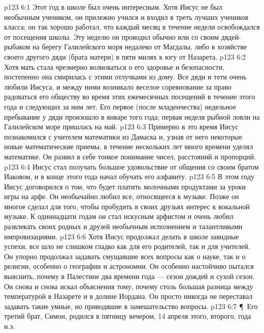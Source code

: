 \vs p123 6:1 Этот год в школе был очень интересным. Хотя Иисус не был необычным учеником, он прилежно учился и входил в треть лучших учеников класса; он так хорошо работал, что каждый месяц в течение недели освобождался от посещения школы. Эту неделю он проводил обычно или со своим дядей\hyp{}рыбаком на берегу Галилейского моря недалеко от Магдалы, либо в хозяйстве своего другого дяди (брата матери) в пяти милях к югу от Назарета.
\vs p123 6:2 Хотя мать стала чрезмерно волноваться о его здоровье и безопасности, постепенно она смирилась с этими отлучками из дому. Все дяди и тети очень любили Иисуса, и между ними возникало веселое соревнование за право радоваться его обществу во время этих ежемесячных посещений в течение этого года и следующих за ним лет. Его первое (после младенчества) недельное пребывание у дяди произошло в январе того года; первая неделя рыбной ловли на Галилейском море пришлась на май.
\vs p123 6:3 Примерно в это время Иисус познакомился с учителем математики из Дамаска и, узнав от него некоторые новые математические приемы, в течение нескольких лет много времени уделял математике. Он развил в себе тонкое понимание чисел, расстояний и пропорций.
\vs p123 6:4 Иисус стал получать большое удовольствие от общения со своим братом Иаковом, и в конце этого года начал обучать его алфавиту.
\vs p123 6:5 В этом году Иисус договорился о том, что будет платить молочными продуктами за уроки игры на арфе. Он необычайно любил все, относящееся к музыке. Позже он многое сделал для того, чтобы пробудить в своих друзьях интерес к вокальной музыке. К одиннадцати годам он стал искусным арфистом и очень любил развлекать своих родных и друзей необычным исполнением и талантливыми импровизациями.
\vs p123 6:6 Хотя Иисус продолжал делать в школе завидные успехи, все шло не слишком гладко как для его родителей, так и для учителей. Он упорно продолжал задавать смущавшие всех вопросы как о науке, так и о религии, особенно о географии и астрономии. Он особенно настойчиво пытался выяснить, почему в Палестине два времени года --- сезон дождей и сухой сезон. Он снова и снова искал объяснения тому, почему столь большая разница между температурой в Назарете и в долине Иордана. Он просто никогда не переставал задавать такие умные, но приводяшие в замешательство вопросы.
\vs p123 6:7 \P\ Его третий брат, Симон, родился в пятницу вечером, 14 апреля этого, второго, года н.э.
